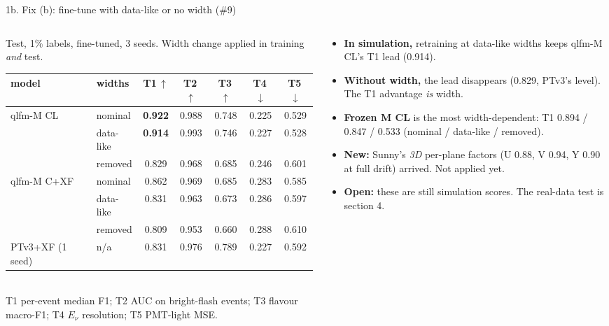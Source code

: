 \documentclass[aspectratio=169,10pt]{beamer}
\newcommand{\good}[1]{{\color{green!45!black}\textbf{#1}}}
\newcommand{\iss}[1]{{\color{blue!60!black}\##1}}
\newcommand{\PTvT}{0.831}
\newcommand{\PTvTT}{0.976}
\newcommand{\PTvTTT}{0.789}
\newcommand{\PTvTTTT}{0.227}
\newcommand{\PTvTTTTT}{0.592}
\newcommand{\PTvSeeds}{1 seed}
\begin{document}
\begin{frame}{1b. Fix (b): fine-tune with data-like or no width (\iss{9})}
  \footnotesize
  \begin{columns}[T]
    \begin{column}{0.58\textwidth}
      \centering
      \scriptsize
      Test, 1\% labels, fine-tuned, 3 seeds. Width change applied in training \emph{and} test.\\[2pt]
      \begin{tabular}{llccccc}
        \toprule
        model & widths & T1\,$\uparrow$ & T2\,$\uparrow$ & T3\,$\uparrow$ & T4\,$\downarrow$ & T5\,$\downarrow$ \\
        \midrule
        qlfm-M CL   & nominal   & \good{0.922} & 0.988 & 0.748 & 0.225 & 0.529 \\
                    & data-like & \good{0.914} & 0.993 & 0.746 & 0.227 & 0.528 \\
                    & removed   & 0.829 & 0.968 & 0.685 & 0.246 & 0.601 \\
        \midrule
        qlfm-M C+XF & nominal   & 0.862 & 0.969 & 0.685 & 0.283 & 0.585 \\
                    & data-like & 0.831 & 0.963 & 0.673 & 0.286 & 0.597 \\
                    & removed   & 0.809 & 0.953 & 0.660 & 0.288 & 0.610 \\
        \midrule
        PTv3+XF (\PTvSeeds) & n/a & \PTvT & \PTvTT & \PTvTTT & \PTvTTTT & \PTvTTTTT \\
        \bottomrule
      \end{tabular}\\[2pt]
      {\tiny T1 per-event median F1; T2 AUC on bright-flash events; T3 flavour macro-F1; T4 $E_\nu$ resolution; T5 PMT-light MSE.}
    \end{column}
    \begin{column}{0.40\textwidth}
      \begin{itemize}\setlength{\itemsep}{5pt}
        \item \textbf{In simulation,} retraining at data-like widths keeps qlfm-M CL's T1 lead (0.914).
        \item \textbf{Without width,} the lead disappears (0.829, PTv3's level). The T1 advantage \emph{is} width.
        \item \textbf{Frozen M CL} is the most width-dependent: T1 0.894 / 0.847 / 0.533 (nominal / data-like / removed).
        \item \textbf{New:} Sunny's \emph{3D} per-plane factors (U 0.88, V 0.94, Y 0.90 at full drift) arrived. Not applied yet.
        \item \textbf{Open:} these are still simulation scores. The real-data test is section 4.
      \end{itemize}
    \end{column}
  \end{columns}
\end{frame}
\end{document}
